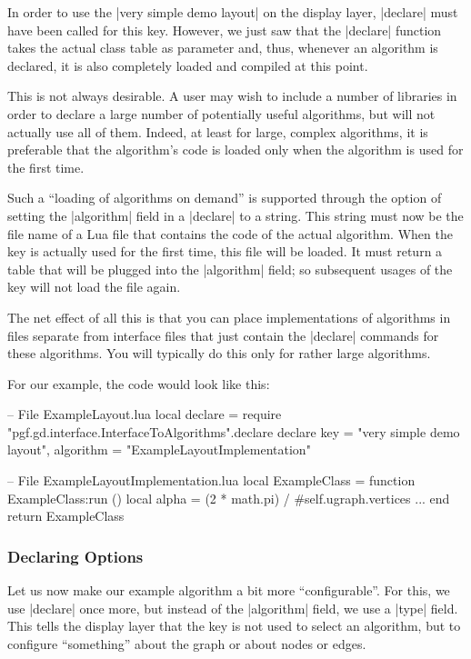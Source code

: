 In order to use the |very simple demo layout| on the display layer, |declare|
must have been called for this key. However, we just saw that the |declare|
function takes the actual class table as parameter and, thus, whenever an
algorithm is declared, it is also completely loaded and compiled at this point.

This is not always desirable. A user may wish to include a number of libraries
in order to declare a large number of potentially useful algorithms, but will
not actually use all of them. Indeed, at least for large, complex algorithms,
it is preferable that the algorithm's code is loaded only when the algorithm is
used for the first time.

Such a ``loading of algorithms on demand'' is supported through the option of
setting the |algorithm| field in a |declare| to a string. This string must now
be the file name of a Lua file that contains the code of the actual algorithm.
When the key is actually used for the first time, this file will be loaded. It
must return a table that will be plugged into the |algorithm| field; so
subsequent usages of the key will not load the file again.

The net effect of all this is that you can place implementations of algorithms
in files separate from interface files that just contain the |declare| commands
for these algorithms. You will typically do this only for rather large
algorithms.

For our example, the code would look like this:
%
\begin{codeexample}[code only, tikz syntax=false]
-- File ExampleLayout.lua
local declare = require "pgf.gd.interface.InterfaceToAlgorithms".declare
declare {
  key = "very simple demo layout",
  algorithm = "ExampleLayoutImplementation"
}
\end{codeexample}

\begin{codeexample}[code only, tikz syntax=false]
-- File ExampleLayoutImplementation.lua
local ExampleClass = {}
function ExampleClass:run ()
  local alpha = (2 * math.pi) / #self.ugraph.vertices
  ...
end
return ExampleClass
\end{codeexample}


\subsubsection{Declaring Options}

Let us now make our example algorithm a bit more ``configurable''. For this, we
use |declare| once more, but instead of the |algorithm| field, we use a |type|
field. This tells the display layer that the key is not used to select an
algorithm, but to configure ``something'' about the graph or about nodes or
edges.

